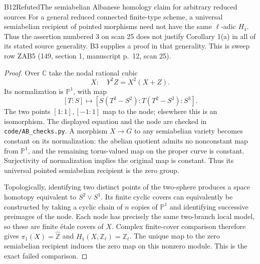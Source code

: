 \begin{result}{B12}{Refuted}{The semiabelian Albanese homology claim for arbitrary reduced sources}
\label{res:B12}
For a general reduced connected finite-type scheme, a universal
semiabelian recipient of pointed morphisms need not have the same
$\ell$-adic $H_1$. Thus the assertion numbered 3 on scan 25 does not
justify Corollary 1(a) in all of its stated source generality.
B3 supplies a proof in that generality. This is sweep row ZAB5
(149, section 1, manuscript p.~12, scan 25).
\end{result}
\begin{proof}
Over $\mathbb C$ take the nodal rational cubic
\[
             X:\quad Y^2Z=X^2(X+Z).
\]
Its normalization is $\mathbb P^1$, with map
\[
 [T:S]\longmapsto
 [S(T^2-S^2):T(T^2-S^2):S^3].
\]
The two points $[1:1],[-1:1]$ map to the node; elsewhere this is
an isomorphism. The displayed equation and the node are checked
in \texttt{code/AB\_checks.py}. A morphism $X\to G$ to any
semiabelian variety becomes constant on its normalization:
the abelian quotient admits no nonconstant map from $\mathbb P^1$,
and the remaining torus-valued map on the proper curve is constant.
Surjectivity of normalization implies the original map is constant.
Thus its universal pointed semiabelian recipient is the zero group.

Topologically, identifying two distinct points of the two-sphere
produces a space homotopy equivalent to $S^2\vee S^1$. Its finite
cyclic covers can equivalently be constructed by taking a cyclic
chain of $n$ copies of $\mathbb P^1$ and identifying successive
preimages of the node. Each node has precisely the same two-branch
local model, so these are finite \'etale covers of $X$.
Complex finite-cover comparison therefore gives
$\pi_1(X)=\widehat{\mathbb Z}$ and
$H_1(X,\mathbb Z_\ell)=\mathbb Z_\ell$.
The unique map to the zero semiabelian recipient induces the zero
map on this nonzero module. This is the exact failed comparison.
\end{proof}

